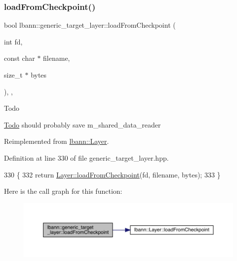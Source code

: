 \subsubsection{\texorpdfstring{load\+From\+Checkpoint()}{loadFromCheckpoint()}}
{\footnotesize\ttfamily bool lbann\+::generic\+\_\+target\+\_\+layer\+::load\+From\+Checkpoint (\begin{DoxyParamCaption}\item[{int}]{fd,  }\item[{const char $\ast$}]{filename,  }\item[{size\+\_\+t $\ast$}]{bytes }\end{DoxyParamCaption})\hspace{0.3cm}{\ttfamily [inline]}, {\ttfamily [override]}, {\ttfamily [virtual]}}

\begin{DoxyRefDesc}{Todo}
\item[\hyperlink{todo__todo000025}{Todo}]should probably save m\+\_\+shared\+\_\+data\+\_\+reader \end{DoxyRefDesc}


Reimplemented from \hyperlink{classlbann_1_1Layer_a7ac9335d75d817fc2d5cf171da9b7e22}{lbann\+::\+Layer}.



Definition at line 330 of file generic\+\_\+target\+\_\+layer.\+hpp.


\begin{DoxyCode}
330                                                                                 \{
332     \textcolor{keywordflow}{return} \hyperlink{classlbann_1_1Layer_a7ac9335d75d817fc2d5cf171da9b7e22}{Layer::loadFromCheckpoint}(fd, filename, bytes);
333   \}
\end{DoxyCode}
Here is the call graph for this function\+:\nopagebreak
\begin{figure}[H]
\begin{center}
\leavevmode
\includegraphics[width=350pt]{classlbann_1_1generic__target__layer_a2d9f6ac689171acf0caceed3ed4f7ef9_cgraph}
\end{center}
\end{figure}
\mbox{\label{classlbann_1_1generic__target__layer_a7c15e3fe4f1fd7f0ccdbc4c3ed8c793e}} 

